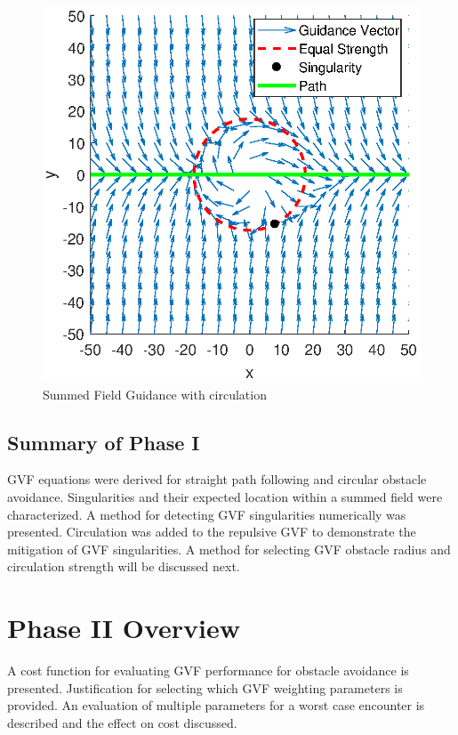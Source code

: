 \documentclass[numbered,pdftex]{ohio-etd}
\begin{document}
\begin{figure}[H]
	\centering
	\includegraphics[trim=0 0 0 0,clip,width=14cm]{PaperFigures/Methods/summedFieldsCircSingularity}
	\caption{Summed Field Guidance with circulation}
	\label{fig:summedGuidanceWithcirc}
\end{figure}

\subsection{Summary of Phase I}
GVF equations were derived for straight path following and circular obstacle avoidance. Singularities and their expected location within a summed field were characterized. A method for detecting GVF singularities numerically was presented. Circulation was added to the repulsive GVF to demonstrate the mitigation of GVF singularities. A method for selecting GVF obstacle radius and circulation strength will be discussed next.



\section{Phase II Overview}
A cost function for evaluating GVF performance for obstacle avoidance is presented. Justification for selecting which GVF weighting parameters is provided. An evaluation of multiple parameters for a worst case encounter is described and the effect on cost discussed. 
\end{document}
